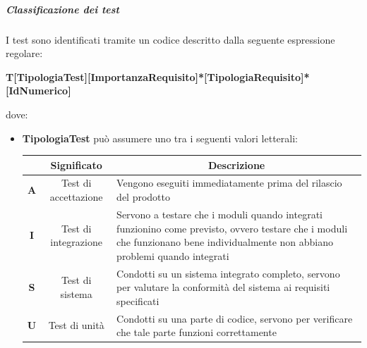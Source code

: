 \subparagraph{Classificazione dei test}
I test sono identificati tramite un codice descritto dalla seguente espressione regolare:
\begin{center}
    \large{\textbf{T[TipologiaTest][ImportanzaRequisito]*[TipologiaRequisito]*[IdNumerico]}}
\end{center}
dove:
\begin{itemize}[label={}]
    \item \textbf{TipologiaTest} può assumere uno tra i seguenti valori letterali:
          \begin{table}[H]
              \centering
              \renewcommand{\arraystretch}{1.8}
              \begin{tabular}{c|c|p{12cm}}
                  \rowcolor[HTML]{125E28}
                  \multicolumn{1}{c}{\color[HTML]{FFFFFF}\textbf{Sigla}}
                             & \multicolumn{1}{c}{\color[HTML]{FFFFFF}\textbf{Significato}}
                             & \multicolumn{1}{c}{\color[HTML]{FFFFFF}\textbf{Descrizione}}                                                                                                                                                                                   \\
                  \hline
                  \textbf{A} & Test di accettazione                                         & Vengono eseguiti immediatamente prima del rilascio del prodotto                                                                                                                 \\
                  \textbf{I} & Test di integrazione                                         & Servono a testare che i moduli quando integrati funzionino come previsto, ovvero testare che i moduli che funzionano bene individualmente non abbiano problemi quando integrati \\
                  \textbf{S} & Test di sistema                                              & Condotti su un sistema integrato completo, servono per valutare la conformità del sistema ai requisiti specificati                                                              \\
                  \textbf{U} & Test di unità                                                & Condotti su una parte di codice, servono per verificare che tale parte funzioni correttamente                                                                                   \\

\end{tabular}
\end{table}
\end{itemize}
